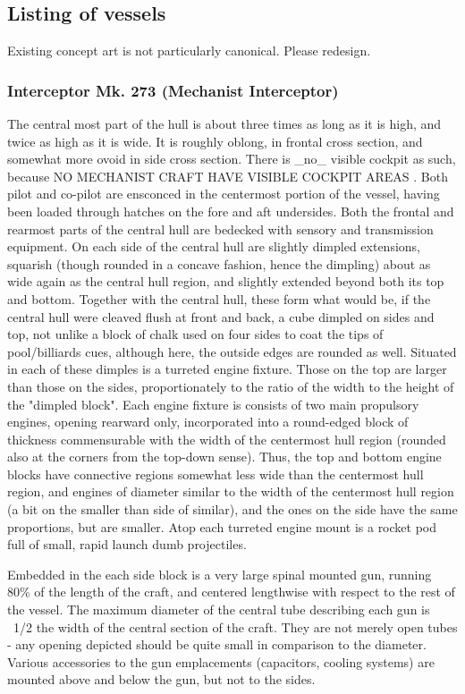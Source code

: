 \subsection{Listing of vessels}

Existing concept art is not particularly canonical. Please redesign.

\subsubsection{Interceptor Mk. 273 (Mechanist Interceptor)}

    The central most part of the hull is about three times as long as it is high, and twice as high as it is wide. It is roughly oblong, in frontal cross section, and somewhat more ovoid in side cross section. There is \_no\_ visible cockpit as such, because NO MECHANIST CRAFT HAVE VISIBLE COCKPIT AREAS . Both pilot and co-pilot are ensconced in the centermost portion of the vessel, having been loaded through hatches on the fore and aft undersides. Both the frontal and rearmost parts of the central hull are bedecked with sensory and transmission equipment. On each side of the central hull are slightly dimpled extensions, squarish (though rounded in a concave fashion, hence the dimpling) about as wide again as the central hull region, and slightly extended beyond both its top and bottom. Together with the central hull, these form what would be, if the central hull were cleaved flush at front and back, a cube dimpled on sides and top, not unlike a block of chalk used on four sides to coat the tips of pool/billiards cues, although here, the outside edges are rounded as well. Situated in each of these dimples is a turreted engine fixture. Those on the top are larger than those on the sides, proportionately to the ratio of the width to the height of the "dimpled block". Each engine fixture is consists of two main propulsory engines, opening rearward only, incorporated into a round-edged block of thickness commensurable with the width of the centermost hull region (rounded also at the corners from the top-down sense). Thus, the top and bottom engine blocks have connective regions somewhat less wide than the centermost hull region, and engines of diameter similar to the width of the centermost hull region (a bit on the smaller than side of similar), and the ones on the side have the same proportions, but are smaller. Atop each turreted engine mount is a rocket pod full of small, rapid launch dumb projectiles.

Embedded in the each side block is a very large spinal mounted gun, running 80\% of the length of the craft, and centered lengthwise with respect to the rest of the vessel. The maximum diameter of the central tube describing each gun is ~1/2 the width of the central section of the craft. They are not merely open tubes - any opening depicted should be quite small in comparison to the diameter. Various accessories to the gun emplacements (capacitors, cooling systems) are mounted above and below the gun, but not to the sides.

